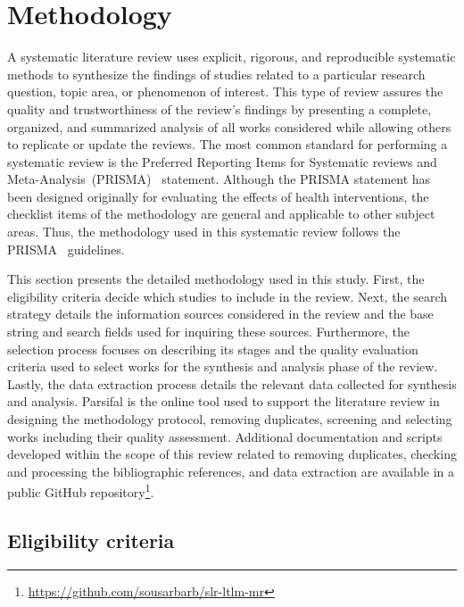 \section{Methodology}
\label{sec:methodology}

A systematic literature review uses explicit, rigorous, and reproducible systematic methods to synthesize the findings of studies related to a particular research question, topic area, or phenomenon of interest. This type of review assures the quality and trustworthiness of the review's findings by presenting a complete, organized, and summarized analysis of all works considered while allowing others to replicate or update the reviews. The most common standard for performing a systematic review is the Preferred Reporting Items for Systematic reviews and Meta-Analysis~(PRISMA)~\parencite{methodology:prisma} statement. Although the PRISMA statement has been designed originally for evaluating the effects of health interventions, the checklist items of the methodology are general and applicable to other subject areas. Thus, the methodology used in this systematic review follows the PRISMA~\parencite{methodology:prisma} guidelines.

This section presents the detailed methodology used in this study. First, the eligibility criteria decide which studies to include in the review. Next, the search strategy details the information sources considered in the review and the base string and search fields used for inquiring these sources. Furthermore, the selection process focuses on describing its stages and the quality evaluation criteria used to select works for the synthesis and analysis phase of the review. Lastly, the data extraction process details the relevant data collected for synthesis and analysis.
Parsifal \parencite{methodology:parsifal} is the online tool used to support the literature review in designing the methodology protocol, removing duplicates, screening and selecting works including their quality assessment. Additional documentation and scripts developed within the scope of this review related to removing duplicates, checking and processing the bibliographic references, and data extraction are available in a public GitHub repository\footnote{\url{https://github.com/sousarbarb/slr-ltlm-mr}}.

\subsection{Eligibility criteria}
\label{sec:methodology:eligible}

